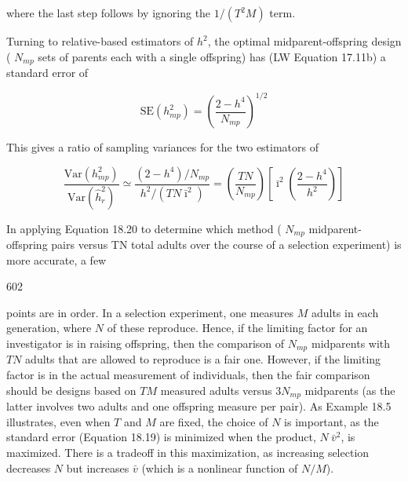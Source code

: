 \documentclass{article}
\begin{document}
where the last step follows by ignoring the  $ 1/(T^{2}M) $ term.

Turning to relative-based estimators of  $ h^{2} $, the optimal midparent-offspring design ( $ N_{mp} $ sets of parents each with a single offspring) has (LW Equation 17.11b) a standard error of

\begin{equation}
\mathrm{SE}(h_{mp}^{2})=\left(\frac{2-h^{4}}{N_{mp}}\right)^{1/2}
\end{equation}

This gives a ratio of sampling variances for the two estimators of

\begin{equation}
\frac{\mathrm{Var}(h_{mp}^{2})}{\mathrm{Var}(\widehat{h}_{r}^{2})}\simeq\frac{(2-h^{4})/N_{mp}}{h^{2}/(TN\bar{\imath}^{2})}=\left(\frac{TN}{N_{mp}}\right)\left[\bar{\imath}^{2}\left(\frac{2-h^{4}}{h^{2}}\right)\right]
\tag{18.20}
\label{eq:18_20}
\end{equation}

In applying Equation 18.20 to determine which method ( $ N_{mp} $ midparent-offspring pairs versus TN total adults over the course of a selection experiment) is more accurate, a few

602

points are in order. In a selection experiment, one measures  $ M $ adults in each generation, where  $ N $ of these reproduce. Hence, if the limiting factor for an investigator is in raising offspring, then the comparison of  $ N_{mp} $ midparents with  $ TN $ adults that are allowed to reproduce is a fair one. However, if the limiting factor is in the actual measurement of individuals, then the fair comparison should be designs based on  $ TM $ measured adults versus  $ 3N_{mp} $ midparents (as the latter involves two adults and one offspring measure per pair). As Example 18.5 illustrates, even when  $ T $ and  $ M $ are fixed, the choice of  $ N $ is important, as the standard error (Equation 18.19) is minimized when the product,  $ N\ \bar{v}^2 $, is maximized. There is a tradeoff in this maximization, as increasing selection decreases  $ N $ but increases  $ \bar{v} $ (which is a nonlinear function of  $ N/M $).
\end{document}
